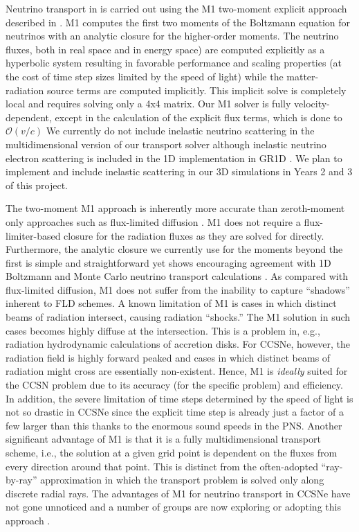 Neutrino transport in \sparkmone is carried out using the M1 two-moment explicit approach described in \citet{OConnor:2015, OConnor:2015a, OConnor:2017a}.
M1 computes the first two moments of the Boltzmann equation for neutrinos with an analytic closure for the higher-order moments.
The neutrino fluxes, both in real space and in energy space) are computed explicitly as a hyperbolic system resulting in favorable performance and scaling properties (at the cost of time step sizes limited by the speed of light) while the matter-radiation source terms are computed implicitly.
This implicit solve is completely local and requires solving only a 4x4 matrix.
Our M1 solver is fully velocity-dependent, except in the calculation of the explicit flux terms, which is done to $\mathcal{O}(v/c)$
We currently do not include inelastic neutrino scattering in the multidimensional version of our transport solver although inelastic neutrino electron scattering is included in the 1D implementation in GR1D \citep{OConnor:2015}.
We plan to implement and include inelastic scattering in our 3D simulations in Years 2 and 3 of this project.

The two-moment M1 approach is inherently more accurate than zeroth-moment only approaches such as flux-limited diffusion \citep[e.g.,][]{Bruenn:2013, Dolence:2015, Lentz:2015}.
M1 does not require a flux-limiter-based closure for the radiation fluxes as they are solved for directly.
Furthermore, the analytic closure we currently use for the moments beyond the first is simple and straightforward yet shows encouraging agreement with 1D Boltzmann and Monte Carlo neutrino transport calculations \citep{OConnor:2015, Murchikova:2017}.
As compared with flux-limited diffusion, M1 does not suffer from the inability to capture ``shadows'' inherent to FLD schemes.
A known limitation of M1 is cases in which distinct beams of radiation intersect, causing radiation ``shocks.''
The M1 solution in such cases becomes highly diffuse at the intersection.
This is a problem in, e.g., radiation hydrodynamic calculations of accretion disks.
For CCSNe, however, the radiation field is highly forward peaked and cases in which distinct beams of radiation might cross are essentially non-existent.
Hence, M1 is {\it ideally} suited for the CCSN problem due to its accuracy (for the specific problem) and efficiency.
In addition, the severe limitation of time steps determined by the speed of light is not so drastic in CCSNe since the explicit time step is already just a factor of a few larger than this thanks to the enormous sound speeds in the PNS.
Another significant advantage of M1 is that it is a fully multidimensional transport scheme, i.e., the solution at a given grid point is dependent on the fluxes from every direction around that point.
This is distinct from the often-adopted ``ray-by-ray'' approximation \citep[e.g.,][]{Bruenn:2013, Bruenn:2016, Muller:2012a, Hanke:2013, Melson:2015, Lentz:2015} in which the transport problem is solved only along discrete radial rays.
The advantages of M1 for neutrino transport in CCSNe have not gone unnoticed and a number of groups are now exploring or adopting this approach \citep{OConnor:2013, Just:2015, Kuroda:2016, Skinner:2016, Roberts:2016}.

